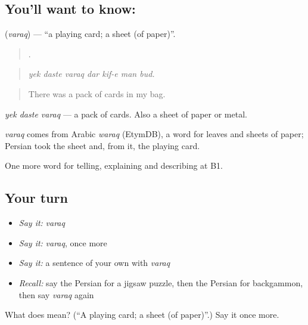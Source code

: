 \subsection*{You'll want to know: }
\textbf{} (\emph{varaq}) — \textquotedblleft{}a playing card; a sheet (of paper)\textquotedblright{}.

\begin{quote}
      .
\end{quote}

\begin{quote}
\emph{yek daste varaq dar kif-e man bud.}
\end{quote}

\begin{quote}
There was a pack of cards in my bag.
\end{quote}

\emph{yek daste varaq} — a pack of cards. Also a sheet of paper or metal.

\begin{cousinweb}
\emph{varaq} comes from Arabic \emph{waraq} (EtymDB), a word for leaves and sheets of paper; Persian took the sheet and, from it, the playing card.
\end{cousinweb}

\begin{grammarlens}[title={What you've built}]
One more word for telling, explaining and describing at B1.
\end{grammarlens}

\subsection*{Your turn}
\begin{itemize}
\raggedright
  \item \emph{Say it:} \emph{varaq}
  \item \emph{Say it:} \emph{varaq}, once more
  \item \emph{Say it:} a sentence of your own with \emph{varaq}
  \item \emph{Recall:} say the Persian for a jigsaw puzzle, then the Persian for backgammon, then say \emph{varaq} again
\end{itemize}

\begin{tcolorbox}[breakable,colback=teal!4,colframe=teal!35!black,title={Before you move on}]
What does  mean? (\textquotedblleft{}A playing card; a sheet (of paper)\textquotedblright{}.) Say it once more.
\end{tcolorbox}
